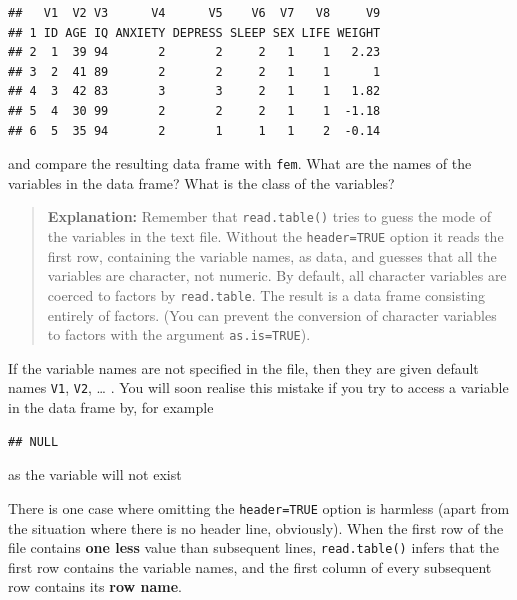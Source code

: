 \documentclass[
]{book}
\newenvironment{Shaded}{\begin{snugshade}}{\end{snugshade}}
\newcommand{\NormalTok}[1]{#1}
\newcommand{\SpecialCharTok}[1]{\textcolor[rgb]{0.81,0.36,0.00}{\textbf{#1}}}
\begin{document}
\begin{verbatim}
##   V1  V2 V3      V4      V5    V6  V7   V8     V9
## 1 ID AGE IQ ANXIETY DEPRESS SLEEP SEX LIFE WEIGHT
## 2  1  39 94       2       2     2   1    1   2.23
## 3  2  41 89       2       2     2   1    1      1
## 4  3  42 83       3       3     2   1    1   1.82
## 5  4  30 99       2       2     2   1    1  -1.18
## 6  5  35 94       2       1     1   1    2  -0.14
\end{verbatim}

and compare the resulting data frame with \texttt{fem}. What are
the names of the variables in the data frame? What is the class
of the variables?

\begin{quote}
\textbf{Explanation:} Remember that \texttt{read.table()} tries to guess
the mode of the variables in the text file. Without the
\texttt{header=TRUE} option it reads the first row, containing the
variable names, as data, and guesses that all the variables are
character, not numeric. By default, all character variables are
coerced to factors by \texttt{read.table}. The result is a data frame
consisting entirely of factors. (You can prevent the conversion of
character variables to factors with the argument \texttt{as.is=TRUE}).
\end{quote}

If the variable names are not specified in the file, then they are
given default names \texttt{V1}, \texttt{V2}, \ldots{} . You will soon realise this
mistake if you try to access a variable in the data frame by, for
example

\begin{Shaded}
\end{Shaded}

\begin{verbatim}
## NULL
\end{verbatim}

as the variable will not exist

There is one case where omitting the \texttt{header=TRUE} option is
harmless (apart from the situation where there is no header line,
obviously). When the first row of the file contains \textbf{one less}
value than subsequent lines, \texttt{read.table()} infers that the first
row contains the variable names, and the first column of every
subsequent row contains its \textbf{row name}.
\end{document}
